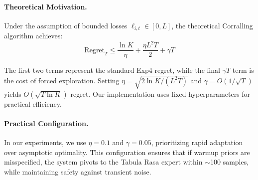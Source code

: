 \paragraph{Theoretical Motivation.} Under the assumption of bounded losses $\ell_{i,t} \in [0, L]$, the theoretical Corralling algorithm achieves:
\begin{equation}
    \text{Regret}_T \leq \frac{\ln K}{\eta} + \frac{\eta L^2 T}{2} + \gamma T
\end{equation}

The first two terms represent the standard Exp4 regret, while the final $\gamma T$ term is the cost of forced exploration. Setting $\eta = \sqrt{2\ln K / (L^2 T)}$ and $\gamma = O(1/\sqrt{T})$ yields $O(\sqrt{T \ln K})$ regret. Our implementation uses fixed hyperparameters for practical efficiency.

\paragraph{Practical Configuration.} In our experiments, we use $\eta = 0.1$ and $\gamma = 0.05$, prioritizing rapid adaptation over asymptotic optimality. This configuration ensures that if warmup priors are misspecified, the system pivots to the Tabula Rasa expert within $\sim$100 samples, while maintaining safety against transient noise.

